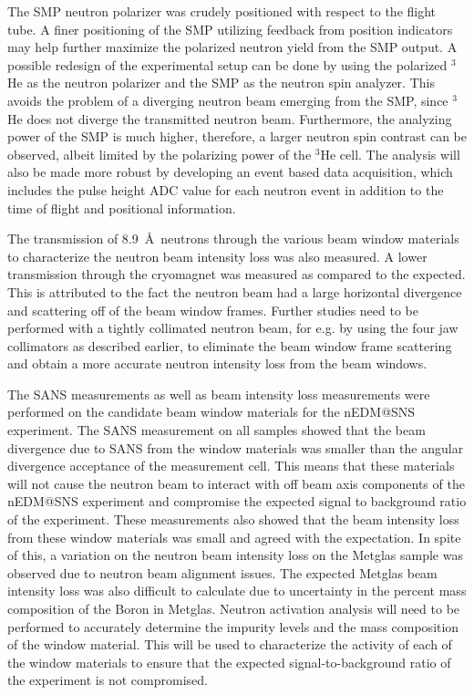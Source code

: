 The SMP neutron polarizer was crudely positioned with respect to the flight tube. A finer positioning of the SMP utilizing feedback from position indicators may help further maximize the polarized neutron yield from the SMP output. A possible redesign of the experimental setup can be done by using the polarized $^3$He as the neutron polarizer and the SMP as the neutron spin analyzer. This avoids the problem of a diverging neutron beam emerging from the SMP, since $^3$He does not diverge the transmitted neutron beam. Furthermore, the analyzing power of the SMP is much higher, therefore, a larger neutron spin contrast can be observed, albeit limited by the polarizing power of the $^3$He cell. The analysis will also be made more robust by developing an event based data acquisition, which includes the pulse height ADC value for each neutron event in addition to the time of flight and positional information.

The transmission of 8.9~\AA\ neutrons through the various beam window materials to characterize the neutron beam intensity loss was also measured. A lower transmission through the cryomagnet was measured as compared to the expected. This is attributed to the fact the neutron beam had a large horizontal divergence and scattering off of the beam window frames. Further studies need to be performed with a tightly collimated neutron beam, for e.g. by using the four jaw collimators as described earlier, to eliminate the beam window frame scattering and obtain a more accurate neutron intensity loss from the beam windows. 

The SANS measurements as well as beam intensity loss measurements were performed on the candidate beam window materials for the nEDM@SNS experiment. The SANS measurement on all samples showed that the beam divergence due to SANS from the window materials was smaller than the angular divergence acceptance of the measurement cell. This means that these materials will not cause the neutron beam to interact with off beam axis components of the nEDM@SNS experiment and compromise the expected signal to background ratio of the experiment. These measurements also showed that the beam intensity loss from these window materials was small and agreed with the expectation. In spite of this, a variation on the neutron beam intensity loss on the Metglas sample was observed due to neutron beam alignment issues. The expected Metglas beam intensity loss was also difficult to calculate due to uncertainty in the percent mass composition of the Boron in Metglas. Neutron activation analysis will need to be performed to accurately determine the impurity levels and the mass composition of the window material. This will be used to characterize the activity of each of the window materials to ensure that the expected signal-to-background ratio of the experiment is not compromised.

